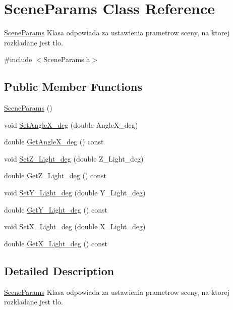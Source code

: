 \hypertarget{class_scene_params}{}\section{Scene\+Params Class Reference}
\label{class_scene_params}


\hyperlink{class_scene_params}{Scene\+Params} Klasa odpowiada za ustawienia prametrow sceny, na ktorej rozkladane jest tlo.  




{\ttfamily \#include $<$Scene\+Params.\+h$>$}

\subsection*{Public Member Functions}
\begin{DoxyCompactItemize}
\item 
\hyperlink{class_scene_params_a55d72e967ec7d3dc0bbc4ec0d0b719cb}{Scene\+Params} ()
\item 
void \hyperlink{class_scene_params_af65a304633ed3407c6ed13ffadd6ebe4}{Set\+Angle\+X\+\_\+deg} (double Angle\+X\+\_\+deg)
\item 
double \hyperlink{class_scene_params_a6a0f668bccc7b0ea760ef7b2404f70be}{Get\+Angle\+X\+\_\+deg} () const
\item 
void \hyperlink{class_scene_params_a6052a5579c94fce2b6342b073c7cd482}{Set\+Z\+\_\+\+Light\+\_\+deg} (double Z\+\_\+\+Light\+\_\+deg)
\item 
double \hyperlink{class_scene_params_a77865fd90e42e56f85bdf9facca85968}{Get\+Z\+\_\+\+Light\+\_\+deg} () const
\item 
void \hyperlink{class_scene_params_a41860a090d574d8db5a723f2c9b10b0e}{Set\+Y\+\_\+\+Light\+\_\+deg} (double Y\+\_\+\+Light\+\_\+deg)
\item 
double \hyperlink{class_scene_params_a2cb3a52b89eefa0b928e71e80aa219f8}{Get\+Y\+\_\+\+Light\+\_\+deg} () const
\item 
void \hyperlink{class_scene_params_aeb3e8e5aed5f1bbe09d7fac60efc3aef}{Set\+X\+\_\+\+Light\+\_\+deg} (double X\+\_\+\+Light\+\_\+deg)
\item 
double \hyperlink{class_scene_params_a19e1dac0b507bfd39b4d11815933abbc}{Get\+X\+\_\+\+Light\+\_\+deg} () const
\end{DoxyCompactItemize}


\subsection{Detailed Description}
\hyperlink{class_scene_params}{Scene\+Params} Klasa odpowiada za ustawienia prametrow sceny, na ktorej rozkladane jest tlo. 

